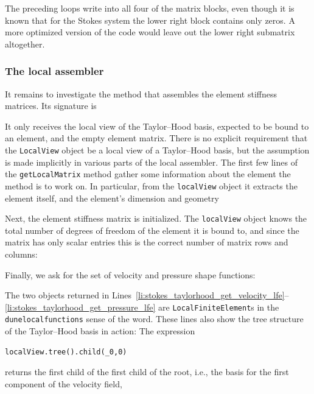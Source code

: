 \documentclass[a4paper,10pt,headings=normal,bibliography=totoc]{scrartcl}
\newcommand{\cpp}[1]{\lstinline[basicstyle=\ttfamily]!#1!}
\newcommand{\dunemodule}[1]{\texttt{#1}}
\begin{document}
The preceding loops write into all four of the matrix blocks, even though
it is known that for the Stokes
system the lower right block contains only zeros.  A more optimized version of the code would leave out the lower right
submatrix altogether.

\subsubsection{The local assembler}

It remains to investigate the method that assembles the element stiffness matrices.  Its signature is
%

%
It only receives the local view of the Taylor--Hood basis, expected to be bound to an element,
and the empty element matrix.  There is no explicit requirement that the \cpp{LocalView} object
be a local view of a Taylor--Hood basis, but the assumption is made implicitly in various
parts of the local assembler.
The first few lines of the \cpp{getLocalMatrix} method gather some information about the element the method is to work on.
In particular, from the \cpp{localView} object it extracts the element itself, and the element's dimension and
geometry
%

%
Next, the element stiffness matrix is initialized.  The \cpp{localView} object knows the total number of
degrees of freedom of the element it is bound to, and since the matrix has only scalar entries this is the correct
number of matrix rows and columns:
%

%
Finally, we ask for the set of velocity and pressure shape functions:
%

%
The two objects returned in
Lines~\ref{li:stokes_taylorhood_get_velocity_lfe}--\ref{li:stokes_taylorhood_get_pressure_lfe}
are \cpp{LocalFiniteElement}s in the \dunemodule{dune\-localfunctions} sense of the word.
These lines also
show the tree structure of the Taylor--Hood basis in action:
The expression
\begin{lstlisting}[style=Example]
localView.tree().child(_0,0)
\end{lstlisting}
returns the first child of the first child of the root, i.e., the basis for the first component of the velocity field,
\end{document}
